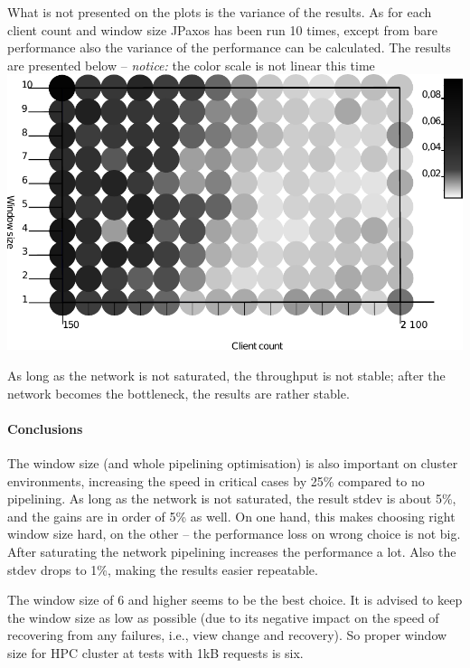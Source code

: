 What is not presented on the plots is the variance of the results. As for each client count and window size JPaxos has been run 10 times, except from bare performance also the variance of the performance can be calculated. The results are presented below -- \emph{notice:} the color scale is not linear this time \\
\includegraphics{varia/ws_3d_dev.pdf}

As long as the network is not saturated, the throughput is not stable; after the network becomes the bottleneck, the results are rather stable.

\paragraph{Conclusions}
The window size (and whole pipelining optimisation) is also important on cluster environments, increasing the speed in critical cases by 25\% compared to no pipelining. As long as the network is not saturated, the result stdev is about 5\%, and the gains are in order of 5\% as well. On one hand, this makes choosing right window size hard, on the other -- the performance loss on wrong choice is not big. After saturating the network pipelining increases the performance a lot. Also the stdev drops to 1\%, making the results easier repeatable.

The window size of 6 and higher seems to be the best choice. It is advised to keep the window size as low as possible (due to its negative impact on the speed of recovering from any failures, i.e., view change and recovery). So proper window size for HPC cluster at tests with 1kB requests is six. 
